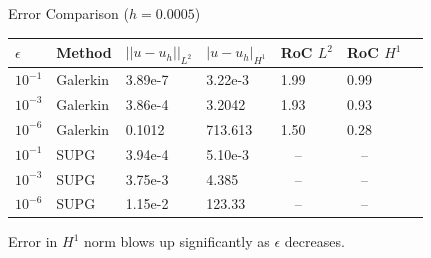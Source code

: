 \documentclass{beamer}
\begin{document}
\begin{frame}{Error Comparison ($h=0.0005$)}
    \centering
    \begin{table}
        \begin{tabular}{l l l l l l l} %
            \toprule
            $\epsilon$ & Method & $||u-u_h||_{L^2}$ & $|u-u_h|_{H^1}$ & RoC $L^2$ & RoC $H^1$\\
            \midrule
            $10^{-1}$ & Galerkin & 3.89e-7 & 3.22e-3 & 1.99 & 0.99 \\
            $10^{-3}$ & Galerkin & 3.86e-4 & 3.2042 & 1.93 & 0.93 \\
            $10^{-6}$ & Galerkin & 0.1012 & 713.613 & 1.50 & 0.28 \\
            \midrule 
            \pause
            $10^{-1}$ & SUPG & 3.94e-4 & 5.10e-3 & ~~-- & ~~-- \\
            $10^{-3}$ & SUPG & 3.75e-3 & 4.385 & ~~-- & ~~-- \\
            $10^{-6}$ & SUPG & 1.15e-2 & 123.33 & ~~-- & ~~-- \\
            \bottomrule
        \end{tabular}
    \end{table}
    Error in $H^1$ norm blows up significantly as $\epsilon$ decreases.
\end{frame}

\end{document}
